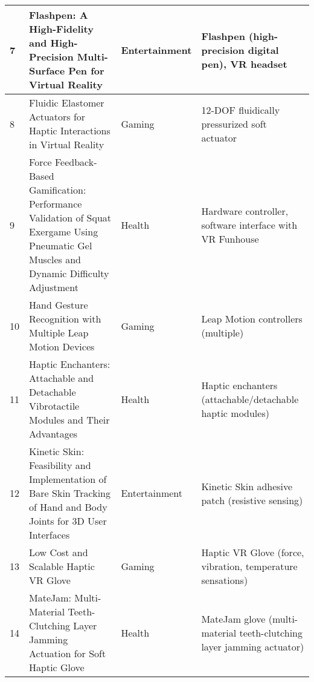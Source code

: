 \begin{landscape}
\begin{table}[]
{\begin{tabular}{|l|l|l|l|}
				7                                & Flashpen: A High-Fidelity and High-Precision Multi-Surface Pen for Virtual Reality                                                        & Entertainment                            & Flashpen (high-precision digital pen), VR headset                           \\ \hline
				8                                & Fluidic Elastomer Actuators for Haptic Interactions in Virtual Reality                                                                    & Gaming                                   & 12-DOF fluidically pressurized soft actuator                                \\ \hline
				9                                & Force Feedback-Based Gamification: Performance Validation of Squat Exergame Using Pneumatic Gel Muscles and Dynamic Difficulty Adjustment & Health                                   & Hardware controller, software interface with VR Funhouse                    \\ \hline
				10                               & Hand Gesture Recognition with Multiple Leap Motion Devices                                                                                & Gaming                                   & Leap Motion controllers (multiple)                                          \\ \hline
				11                               & Haptic Enchanters: Attachable and Detachable Vibrotactile Modules and Their Advantages                                                    & Health                                   & Haptic enchanters (attachable/detachable haptic modules)                    \\ \hline
				12                               & Kinetic Skin: Feasibility and Implementation of Bare Skin Tracking of Hand and Body Joints for 3D User Interfaces                         & Entertainment                            & Kinetic Skin adhesive patch (resistive sensing)                             \\ \hline
				13                               & Low Cost and Scalable Haptic VR Glove                                                                                                     & Gaming                                   & Haptic VR Glove (force, vibration, temperature sensations)                  \\ \hline
				14                               & MateJam: Multi-Material Teeth-Clutching Layer Jamming Actuation for Soft Haptic Glove                                                     & Health                                   & MateJam glove (multi-material teeth-clutching layer jamming actuator)       \\ \hline

\end{tabular}}
\end{table}
\end{landscape}
